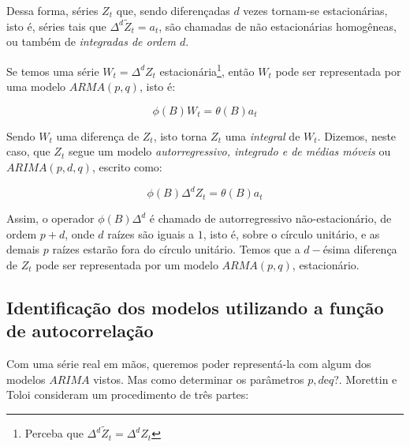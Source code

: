 Dessa forma, séries $Z_t$ que, sendo diferençadas $d$ vezes tornam-se estacionárias, isto é, séries tais que $\Delta^d \tilde{Z}_t = a_t$, são chamadas de não estacionárias homogêneas, ou também de \emph{integradas de ordem $d$}.

Se temos uma série $W_t = \Delta^d Z_t$ estacionária\footnote{Perceba que $\Delta^d \tilde{Z}_t = \Delta^d Z_t$}, então $W_t$ pode ser representada por uma modelo $ARMA(p, q)$, isto é:

\[
\phi(B) W_t = \theta(B) a_t
\]

Sendo $W_t$ uma diferença de $Z_t$, isto torna $Z_t$ uma \emph{integral} de $W_t$. Dizemos, neste caso, 
que $Z_t$ segue um modelo \emph{autorregressivo, integrado e de médias móveis} ou $ARIMA(p, d, q)$, escrito como:

\begin{equation}\label{series:5.75}
\phi(B) \Delta^d Z_t = \theta(B) a_t
\end{equation}

Assim, o operador $\phi(B) \Delta^d$ é chamado de autorregressivo não-estacionário, de ordem $p{+}d$, onde $d$ raízes são iguais a $1$, isto é, sobre o círculo unitário, e as demais $p$ raízes estarão fora do círculo unitário. Temos que a $d-$ésima diferença de $Z_t$ pode ser representada por um modelo $ARMA(p, q)$, estacionário. 

\subsection{Identificação dos modelos utilizando a função de autocorrelação}

Com uma série real em mãos, queremos poder representá-la com algum dos modelos $ARIMA$ vistos. Mas como determinar os parâmetros $p, d \text{e} q$?. Morettin e Toloi \citep{morettin} consideram um procedimento de três partes:





